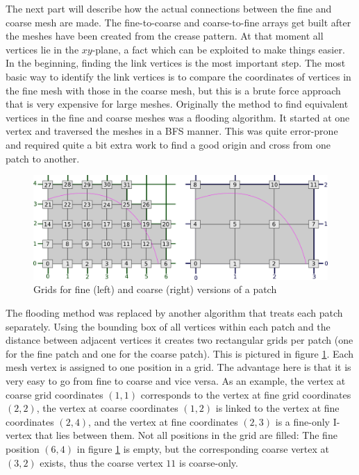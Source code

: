 \documentclass[a4paper,twoside,12pt,nochapterprefix]{scrbook}
\begin{document}
\label{sec:conversion}
The next part will describe how the actual connections between the fine and coarse mesh are made. The fine-to-coarse and coarse-to-fine arrays get built after the meshes have been created from the crease pattern. At that moment all vertices lie in the $xy$-plane, a fact which can be exploited to make things easier.\newline
In the beginning, finding the link vertices is the most important step. The most basic way to identify the link vertices is to compare the coordinates of vertices in the fine mesh with those in the coarse mesh, but this is a brute force approach that is very expensive for large meshes.\newline
Originally the method to find equivalent vertices in the fine and coarse meshes was a flooding algorithm. It started at one vertex and traversed the meshes in a BFS manner. This was quite error-prone and required quite a bit extra work to find a good origin and cross from one patch to another.\newline
\begin{figure}
    \centering
    \includegraphics[width=0.9\linewidth]{figures/0317_conversiongrid}
    \caption{Grids for fine (left) and coarse (right) versions of a patch}
    \label{fig:conversion_grid}
\end{figure}
The flooding method was replaced by another algorithm that treats each patch separately. Using the bounding box of all vertices within each patch and the distance between adjacent vertices it creates two rectangular grids per patch (one for the fine patch and one for the coarse patch). This is pictured in figure \ref{fig:conversion_grid}. Each mesh vertex is assigned to one position in a grid. The advantage here is that it is very easy to go from fine to coarse and vice versa. As an example, the vertex at coarse grid coordinates $(1,1)$ corresponds to the vertex at fine grid coordinates $(2,2)$, the vertex at coarse coordinates $(1,2)$ is linked to the vertex at fine coordinates $(2,4)$, and the vertex at fine coordinates $(2,3)$ is a fine-only I-vertex that lies between them. Not all positions in the grid are filled: The fine position $(6,4)$ in figure \ref{fig:conversion_grid} is empty, but the corresponding coarse vertex at $(3,2)$ exists, thus the coarse vertex $11$ is coarse-only.\newline
\end{document}
